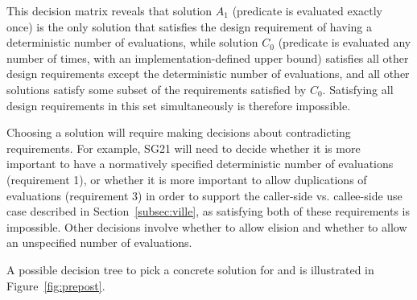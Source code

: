This decision matrix reveals that solution $A_1$ (predicate is evaluated exactly once) is the only solution that satisfies the design requirement of having a deterministic number of evaluations, while solution $C_0$ (predicate is evaluated any number of times, with an implementation-defined upper bound) satisfies all other design requirements except the deterministic number of evaluations, and all other solutions satisfy some subset of the requirements satisfied by $C_0$. Satisfying all design requirements in this set simultaneously is therefore impossible.

Choosing a solution will require making decisions about contradicting requirements. For example, SG21 will need to decide  whether it is more important to have a normatively specified deterministic number of evaluations (requirement 1), or whether it is more important to allow duplications of evaluations (requirement 3) in order to support the caller-side vs. callee-side use case described in Section~\ref{subsec:ville}, as satisfying both of these requirements is impossible. Other decisions involve whether to allow elision and whether to allow an unspecified number of evaluations.



A possible decision tree to pick a concrete solution for  and  is illustrated in Figure~\ref{fig:prepost}.

